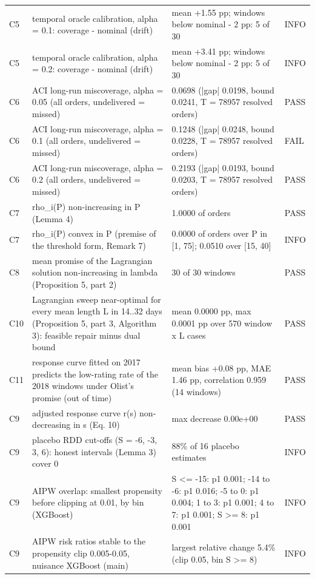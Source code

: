 \begin{table}[!htbp]
\begin{tabular}{lp{5.5cm}p{6cm}l}
C5 & temporal oracle calibration, alpha = 0.1: coverage - nominal (drift) & mean +1.55 pp; windows below nominal - 2 pp: 5 of 30 & INFO \\
C5 & temporal oracle calibration, alpha = 0.2: coverage - nominal (drift) & mean +3.41 pp; windows below nominal - 2 pp: 5 of 30 & INFO \\
C6 & ACI long-run miscoverage, alpha = 0.05 (all orders, undelivered = missed) & 0.0698 (|gap| 0.0198, bound 0.0241, T = 78957 resolved orders) & PASS \\
C6 & ACI long-run miscoverage, alpha = 0.1 (all orders, undelivered = missed) & 0.1248 (|gap| 0.0248, bound 0.0228, T = 78957 resolved orders) & FAIL \\
C6 & ACI long-run miscoverage, alpha = 0.2 (all orders, undelivered = missed) & 0.2193 (|gap| 0.0193, bound 0.0203, T = 78957 resolved orders) & PASS \\
C7 & rho\_i(P) non-increasing in P (Lemma 4) & 1.0000 of orders & PASS \\
C7 & rho\_i(P) convex in P (premise of the threshold form, Remark 7) & 0.0000 of orders over P in [1, 75]; 0.0510 over [15, 40] & INFO \\
C8 & mean promise of the Lagrangian solution non-increasing in lambda (Proposition 5, part 2) & 30 of 30 windows & PASS \\
C10 & Lagrangian sweep near-optimal for every mean length L in 14..32 days (Proposition 5, part 3, Algorithm 3): feasible repair minus dual bound & mean 0.0000 pp, max 0.0001 pp over 570 window x L cases & PASS \\
C11 & response curve fitted on 2017 predicts the low-rating rate of the 2018 windows under Olist's promise (out of time) & mean bias +0.08 pp, MAE 1.46 pp, correlation 0.959 (14 windows) & PASS \\
C9 & adjusted response curve r(s) non-decreasing in s (Eq. 10) & max decrease 0.00e+00 & PASS \\
C9 & placebo RDD cut-offs (S = -6, -3, 3, 6): honest intervals (Lemma 3) cover 0 & 88\% of 16 placebo estimates & INFO \\
C9 & AIPW overlap: smallest propensity before clipping at 0.01, by bin (XGBoost) & S <= -15: p1 0.001; -14 to -6: p1 0.016; -5 to 0: p1 0.004; 1 to 3: p1 0.001; 4 to 7: p1 0.001; S >= 8: p1 0.001 & INFO \\
C9 & AIPW risk ratios stable to the propensity clip 0.005-0.05, nuisance XGBoost (main) & largest relative change 5.4\% (clip 0.05, bin S >= 8) & INFO \\

\end{tabular}
\end{table}
